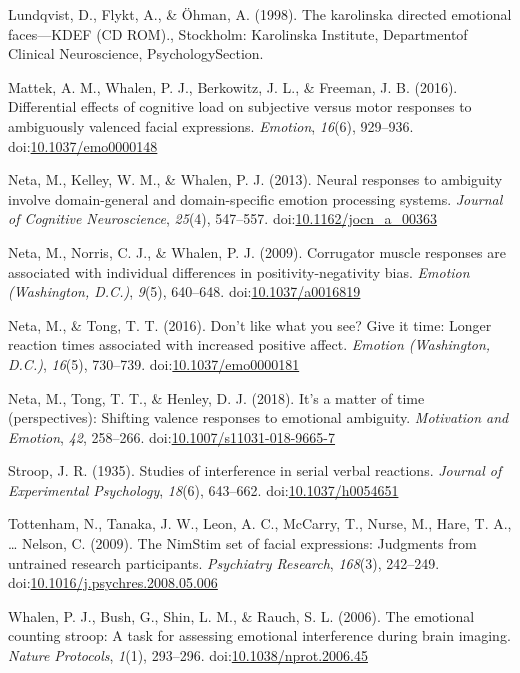\documentclass[man]{apa6}
\begin{document}
\leavevmode\hypertarget{ref-lundqvist_karolinska_1998}{}%
Lundqvist, D., Flykt, A., \& Öhman, A. (1998). The karolinska directed emotional faces---KDEF (CD ROM)., Stockholm: Karolinska Institute, Departmentof Clinical Neuroscience, PsychologySection.

\leavevmode\hypertarget{ref-mattek_differential_2016}{}%
Mattek, A. M., Whalen, P. J., Berkowitz, J. L., \& Freeman, J. B. (2016). Differential effects of cognitive load on subjective versus motor responses to ambiguously valenced facial expressions. \emph{Emotion}, \emph{16}(6), 929--936. doi:\href{https://doi.org/10.1037/emo0000148}{10.1037/emo0000148}

\leavevmode\hypertarget{ref-neta_neural_2013}{}%
Neta, M., Kelley, W. M., \& Whalen, P. J. (2013). Neural responses to ambiguity involve domain-general and domain-specific emotion processing systems. \emph{Journal of Cognitive Neuroscience}, \emph{25}(4), 547--557. doi:\href{https://doi.org/10.1162/jocn_a_00363}{10.1162/jocn\_a\_00363}

\leavevmode\hypertarget{ref-neta_corrugator_2009}{}%
Neta, M., Norris, C. J., \& Whalen, P. J. (2009). Corrugator muscle responses are associated with individual differences in positivity-negativity bias. \emph{Emotion (Washington, D.C.)}, \emph{9}(5), 640--648. doi:\href{https://doi.org/10.1037/a0016819}{10.1037/a0016819}

\leavevmode\hypertarget{ref-neta_dont_2016}{}%
Neta, M., \& Tong, T. T. (2016). Don't like what you see? Give it time: Longer reaction times associated with increased positive affect. \emph{Emotion (Washington, D.C.)}, \emph{16}(5), 730--739. doi:\href{https://doi.org/10.1037/emo0000181}{10.1037/emo0000181}

\leavevmode\hypertarget{ref-neta_its_2018}{}%
Neta, M., Tong, T. T., \& Henley, D. J. (2018). It's a matter of time (perspectives): Shifting valence responses to emotional ambiguity. \emph{Motivation and Emotion}, \emph{42}, 258--266. doi:\href{https://doi.org/10.1007/s11031-018-9665-7}{10.1007/s11031-018-9665-7}

\leavevmode\hypertarget{ref-stroop_studies_1935}{}%
Stroop, J. R. (1935). Studies of interference in serial verbal reactions. \emph{Journal of Experimental Psychology}, \emph{18}(6), 643--662. doi:\href{https://doi.org/10.1037/h0054651}{10.1037/h0054651}

\leavevmode\hypertarget{ref-tottenham_nimstim_2009}{}%
Tottenham, N., Tanaka, J. W., Leon, A. C., McCarry, T., Nurse, M., Hare, T. A., \ldots{} Nelson, C. (2009). The NimStim set of facial expressions: Judgments from untrained research participants. \emph{Psychiatry Research}, \emph{168}(3), 242--249. doi:\href{https://doi.org/10.1016/j.psychres.2008.05.006}{10.1016/j.psychres.2008.05.006}

\leavevmode\hypertarget{ref-whalen_emotional_2006}{}%
Whalen, P. J., Bush, G., Shin, L. M., \& Rauch, S. L. (2006). The emotional counting stroop: A task for assessing emotional interference during brain imaging. \emph{Nature Protocols}, \emph{1}(1), 293--296. doi:\href{https://doi.org/10.1038/nprot.2006.45}{10.1038/nprot.2006.45}

\endgroup
\end{document}
